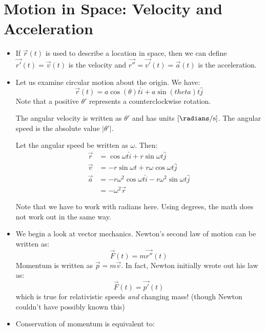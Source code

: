 \section{Motion in Space: Velocity and Acceleration}
\begin{itemize}
    \item If $\vec{r}(t)$ is used to describe a location in space, then we can define $\vec{r'}(t) = \vec{v}(t)$ is the velocity and $\vec{r''}=\vec{v'}(t) = \vec{a}(t)$ is the acceleration.
    \item Let us examine circular motion about the origin. We have:
    \begin{equation}
        \vec{r}(t)  = a\cos(\theta) t \hat{i} + a\sin(theta)t \hat{j}
    \end{equation}
    Note that a positive $\theta'$ represents a counterclockwise rotation.
    \begin{definition}
        The angular velocity is written as $\theta'$ and has units $[\si{\radians\per\second}]$. The angular speed is the absolute value $|\theta'|$.
    \end{definition}
    Let the angular speed be written as $\omega$. Then:
    \begin{align}
        \vec{r} &= \cos \omega t \hat{i} + r\sin \omega t\hat{j} \\ 
        \vec{v} &= -r\sin \omega t + r\omega \cos \omega t \hat{j} \\ 
        \vec{a} &= -r\omega^2 \cos \omega t\hat{i} - r\omega^2 \sin \omega t\hat{j} \\ 
        &= -\omega^2 \vec{r}
    \end{align}
    \begin{warning}
        Note that we have to work with radians here. Using degrees, the math does not work out in the same way.
    \end{warning}
    \item We begin a look  at vector mechanics. Newton's second law of motion can be written as:
    \begin{equation}
        \vec{F}(t) = m\vec{r''}(t)
    \end{equation}
    Momentum is written as $\vec{p}=m\vec{v}$. In fact, Newton initially wrote out his law as:
    \begin{equation}
        \vec{F}(t) = \vec{p'}(t)
    \end{equation}
    which is true for relativistic speeds \textit{and} changing mass! (though Newton couldn't have possibly known this)
    \item Conservation of momentum is equivalent to:

\end{itemize}
